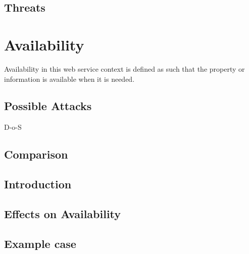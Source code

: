 \subsection{Threats}
\begin{sloppypar}

\end{sloppypar}




\section{Availability}
\begin{sloppypar}
    Availability in this web service context is defined as such that the property or information 
    is available when it is needed.
\end{sloppypar}

\subsection{Possible Attacks}
\begin{sloppypar}
    D-o-S 
\end{sloppypar}



\subsection{Comparison}
\begin{sloppypar}
    
\end{sloppypar}


\subsection{Introduction}
\begin{sloppypar}

\end{sloppypar}

\subsection{Effects on Availability}
\begin{sloppypar}

\end{sloppypar}

\subsection{Example case}
\begin{sloppypar}

\end{sloppypar}




